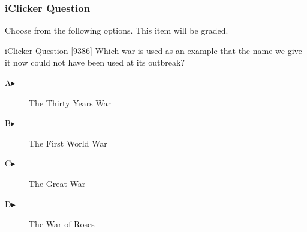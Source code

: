 \begin{frame}
  \frametitle{iClicker Question}
Choose from the following options. This item will be graded.
\begin{block}{iClicker Question}
[9386] Which war is used as an example that the name we give it now could
not have been used at its outbreak?
\end{block}
\begin{description}
\item[A\hspace{.2in}$\blacktriangleright$] The Thirty Years War
\item[B\hspace{.2in}$\blacktriangleright$] The First World War
\item[C\hspace{.2in}$\blacktriangleright$] The Great War
\item[D\hspace{.2in}$\blacktriangleright$] The War of Roses
\end{description}
\end{frame}
